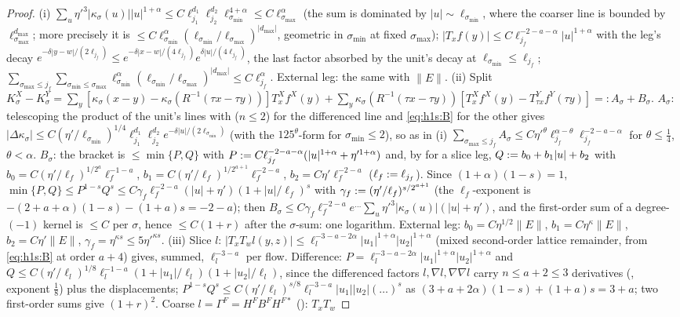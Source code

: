 \begin{proof}
(i) $\sum_u\eta'^3|\kappa_\sigma(u)||u|^{1+\alpha}\le C\ell_{j_1}^{d_1}\ell_{j_2}^{d_2}\ell_{\sigma_{\min}}^{4+\alpha}\le C\ell_{\sigma_{\max}}^\alpha$ (the sum is dominated by $|u|\sim\ell_{\sigma_{\min}}$, where the coarser line is bounded by $\ell_{\sigma_{\max}}^{d_{\max}}$; more precisely it is $\le C\ell_{\sigma_{\min}}^{\alpha}(\ell_{\sigma_{\min}}/\ell_{\sigma_{\max}})^{|d_{\max}|}$, geometric in $\sigma_{\min}$ at fixed $\sigma_{\max}$); $|T_xf(y)|\le C\ell_{j_f}^{-2-a-\alpha}|u|^{1+\alpha}$ with the leg's decay $e^{-\delta|y-w|/(2\ell_{j_f})}\le e^{-\delta|x-w|/(4\ell_{j_f})}e^{\delta|u|/(4\ell_{j_f})}$, the last factor absorbed by the unit's decay at $\ell_{\sigma_{\min}}\le\ell_{j_f}$; $\sum_{\sigma_{\max}\le j_f}\sum_{\sigma_{\min}\le\sigma_{\max}}\ell_{\sigma_{\min}}^{\alpha}(\ell_{\sigma_{\min}}/\ell_{\sigma_{\max}})^{|d_{\max}|}\le C\ell_{j_f}^\alpha$. External leg: the same with $\|E\|$. (ii) Split $K^X_\sigma-K^Y_\sigma=\sum_y[\kappa_\sigma(x-y)-\kappa_\sigma(R^{-1}(\tau x-\tau y))]T^X_xf^X(y)+\sum_y\kappa_\sigma(R^{-1}(\tau x-\tau y))[T^X_xf^X(y)-T^Y_{\tau x}f^Y(\tau y)]=:A_\sigma+B_\sigma$. $A_\sigma$: telescoping the product of the unit's lines with  ($n\le2$) for the differenced line and \eqref{eq:h1s:B} for the other gives $|\Delta\kappa_\sigma|\le C(\eta'/\ell_{\sigma_{\min}})^{1/4}\ell_{j_1}^{d_1}\ell_{j_2}^{d_2}e^{-\delta|u|/(2\ell_{\sigma_{\min}})}$ (with the $125^\theta$-form for $\sigma_{\min}\le2$), so as in (i) $\sum_{\sigma_{\max}\le j_f}A_\sigma\le C\eta'^\theta\ell_{j_f}^{\alpha-\theta}\ell_{j_f}^{-2-a-\alpha}$ for $\theta\le\frac14$, $\theta<\alpha$. $B_\sigma$: the bracket is $\le\min\{P,Q\}$ with $P:= C\ell_{j_f}^{-2-a-\alpha}(|u|^{1+\alpha}+\eta'^{1+\alpha})$ and, by  for a slice leg, $Q:= b_0+b_1|u|+b_2$ with $b_0=C(\eta'/\ell_f)^{1/2^a}\ell_f^{-1-a}$, $b_1=C(\eta'/\ell_f)^{1/2^{a+1}}\ell_f^{-2-a}$, $b_2=C\eta'\ell_f^{-2-a}$ ($\ell_f:=\ell_{j_f}$). Since $(1+\alpha)(1-s)=1$, $\min\{P,Q\}\le P^{1-s}Q^s\le C\gamma_f\ell_f^{-2-a}(|u|+\eta')(1+|u|/\ell_f)^s$ with $\gamma_f:=(\eta'/\ell_f)^{s/2^{a+1}}$ (the $\ell_f$-exponent is $-(2+a+\alpha)(1-s)-(1+a)s=-2-a$); then $B_\sigma\le C\gamma_f\ell_f^{-2-a}e^{\dots}\sum_u\eta'^3|\kappa_\sigma(u)|(|u|+\eta')$, and the first-order sum of a degree-$(-1)$ kernel is $\le C$ per $\sigma$, hence $\le C(1+r)$ after the $\sigma$-sum: one logarithm. External leg: $b_0=C\eta^{1/2}\|E\|$, $b_1=C\eta^\kappa\|E\|$, $b_2=C\eta'\|E\|$, $\gamma_f=\eta^{\kappa s}\le5\eta'^{\kappa s}$. (iii) Slice $l$: $|T_xT_wl(y,z)|\le\ell_l^{-3-a-2\alpha}|u_1|^{1+\alpha}|u_2|^{1+\alpha}$ (mixed second-order lattice remainder, from \eqref{eq:h1s:B} at order $a+4$) gives, summed, $\ell_l^{-3-a}$ per flow. Difference: $P=\ell_l^{-3-a-2\alpha}|u_1|^{1+\alpha}|u_2|^{1+\alpha}$ and $Q\le C(\eta'/\ell_l)^{1/8}\ell_l^{-1-a}(1+|u_1|/\ell_l)(1+|u_2|/\ell_l)$, since the differenced factors $l,\nabla l,\nabla\nabla l$ carry $n\le a+2\le3$ derivatives (, exponent $\frac18$) plus the displacements; $P^{1-s}Q^s\le C(\eta'/\ell_l)^{s/8}\ell_l^{-3-a}|u_1||u_2|(\dots)^s$ as $(3+a+2\alpha)(1-s)+(1+a)s=3+a$; two first-order sums give $(1+r)^2$. Coarse $l=\Gamma^F=H^FB^FH^{F*}$ (): $T_xT_w$ 
\end{proof}
